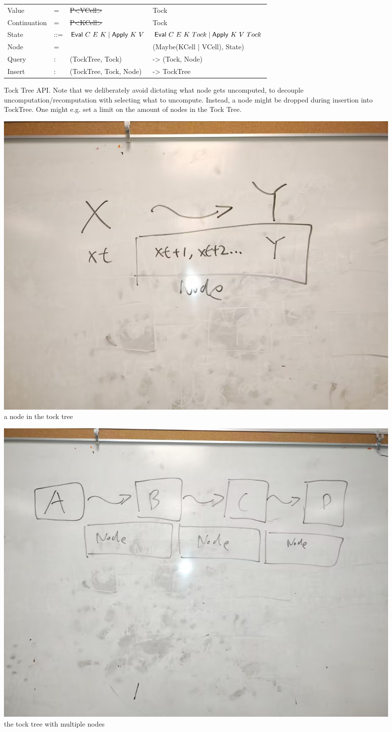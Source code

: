 \begin{figure}
    \begin{tabular}{p{5em} p{3em} p{10em} p{}}
        Value & = & \st{P<VCell>} & Tock \\
        Continuation & = & \st{P<KCell>} & Tock \\
        State & ::= & \st{$\text{\textsf{Eval}}~C~E~K \mid \text{\textsf{Apply}}~K~V $} & $\text{\textsf{Eval}}~C~E~K~Tock \mid \text{\textsf{Apply}}~K~V~Tock $ \\
        Node & = & & (Maybe(KCell | VCell), State) \\
        Query & $:$ & (TockTree, Tock) & -> (Tock, Node) \\
        Insert & $:$ & (TockTree, Tock, Node) & -> TockTree \\
    \end{tabular}
    \caption{Tock Tree API. Note that we deliberately avoid dictating what node gets uncomputed, to decouple uncomputation/recomputation with selecting what to uncompute. Instead, a node might be dropped during insertion into TockTree. One might e.g. set a limit on the amount of nodes in the Tock Tree. }
\end{figure}
\begin{figure}
    \includegraphics[width=0.5\columnwidth]{img2}
    \caption{a node in the tock tree}
\end{figure}
\begin{figure}
    \includegraphics[width=0.5\columnwidth]{img3}
    \caption{the tock tree with multiple nodes}
\end{figure}

